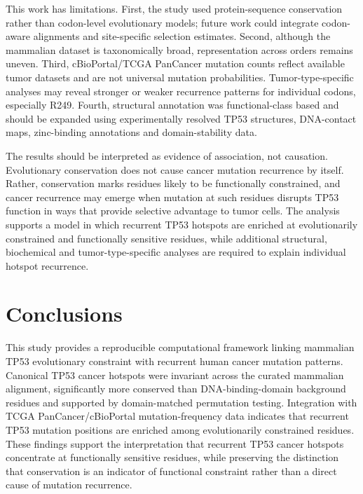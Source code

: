 \documentclass[namedate,webpdf,contemporary,large]{oup-authoring-template}
\begin{document}
This work has limitations. First, the study used protein-sequence conservation rather than codon-level evolutionary models; future work could integrate codon-aware alignments and site-specific selection estimates. Second, although the mammalian dataset is taxonomically broad, representation across orders remains uneven. Third, cBioPortal/TCGA PanCancer mutation counts reflect available tumor datasets and are not universal mutation probabilities. Tumor-type-specific analyses may reveal stronger or weaker recurrence patterns for individual codons, especially R249. Fourth, structural annotation was functional-class based and should be expanded using experimentally resolved TP53 structures, DNA-contact maps, zinc-binding annotations and domain-stability data.

The results should be interpreted as evidence of association, not causation. Evolutionary conservation does not cause cancer mutation recurrence by itself. Rather, conservation marks residues likely to be functionally constrained, and cancer recurrence may emerge when mutation at such residues disrupts TP53 function in ways that provide selective advantage to tumor cells. The analysis supports a model in which recurrent TP53 hotspots are enriched at evolutionarily constrained and functionally sensitive residues, while additional structural, biochemical and tumor-type-specific analyses are required to explain individual hotspot recurrence.

\section{Conclusions}
This study provides a reproducible computational framework linking mammalian TP53 evolutionary constraint with recurrent human cancer mutation patterns. Canonical TP53 cancer hotspots were invariant across the curated mammalian alignment, significantly more conserved than DNA-binding-domain background residues and supported by domain-matched permutation testing. Integration with TCGA PanCancer/cBioPortal mutation-frequency data indicates that recurrent TP53 mutation positions are enriched among evolutionarily constrained residues. These findings support the interpretation that recurrent TP53 cancer hotspots concentrate at functionally sensitive residues, while preserving the distinction that conservation is an indicator of functional constraint rather than a direct cause of mutation recurrence.
\end{document}
